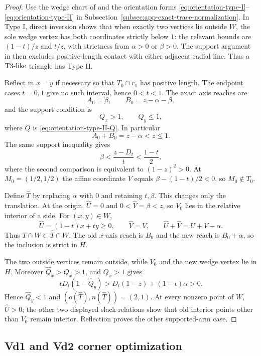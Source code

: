 \begin{proof}
Use the wedge chart of  and the
orientation forms \eqref{eq:orientation-type-I}--
\eqref{eq:orientation-type-II} in
Subsection~\ref{subsec:app-exact-trace-normalization}.  In Type I,
direct inversion shows that when exactly two vertices lie outside $W$, the
sole wedge vertex has both coordinates strictly below $1$: the relevant
bounds are $(1-t)/z$ and $t/z$, with strictness from $\alpha>0$ or
$\beta>0$.  The support argument in
 then excludes positive-length contact
with either adjacent radial line.  Thus a $\mathrm{T3\text{-}like}$ triangle has Type II.

Reflect in $x=y$ if necessary so that $T_0\cap r_1$ has positive length.
The endpoint cases $t=0,1$ give no such interval, hence $0<t<1$.  The exact
axis reaches are
\[
 A_0=\beta,\qquad B_0=z-\alpha-\beta,
\]
and the support condition is
\[
 Q_x>1,\qquad Q_y\le1,
\]
where $Q$ is \eqref{eq:orientation-type-II-Q}.  In particular
\[
 A_0+B_0=z-\alpha<z\le1.
\]
The same support inequality gives
\[
 \beta<\frac{z-D_t}{t}<\frac{1-t}{2},
\]
where the second comparison is equivalent to $(1-z)^2>0$.
At $M_0=(1/2,1/2)$ the affine coordinate $V$ equals
$\beta-(1-t)/2<0$, so $M_0\notin T_0$.

Define $\widehat T$ by replacing $\alpha$ with $0$ and retaining $t,\beta$.
This changes only the translation.  At the origin,
$\widehat U=0$ and $0<\widehat V=\beta<z$, so $V_0$ lies in the relative
interior of a side.  For $(x,y)\in W$,
\[
 \widehat U=(1-t)x+ty\ge0,
 \qquad\widehat V=V,
 \qquad\widehat U+\widehat V=U+V-\alpha.
\]
Thus $T\cap W\subset\widehat T\cap W$.  The old $x$-axis reach is $B_0$ and
the new reach is $B_0+\alpha$, so the inclusion is strict in $H$.

The two outside vertices remain outside, while $V_0$ and the new wedge vertex
lie in $H$.  Moreover $\widehat Q_x>Q_x>1$, and $Q_x>1$ gives
\[
 tD_t(1-\widehat Q_y)
 >D_t(1-z)+(1-t)\alpha>0.
\]
Hence $\widehat Q_y<1$ and $(o(\widehat T),n(\widehat T))=(2,1)$.  At every
nonzero point of $W$, $\widehat U>0$; the other two displayed slack relations
show that old interior points other than $V_0$ remain interior.  Reflection
proves the other supported-arm case.
\end{proof}

\subsection{Vd1 and Vd2 corner optimization}

